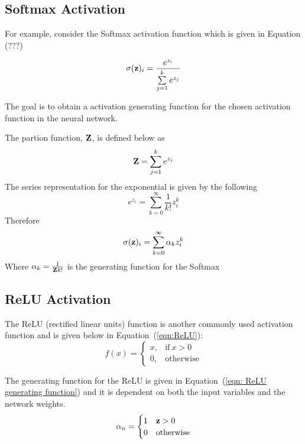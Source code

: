
\subsection{Softmax Activation}

For example, consider the Softmax activation function which is given in Equation (???)

\begin{equation}
	\sigma(\bold z)_i =
	\frac{e^{z_i}}{\sum\limits_{j=1}^k e^{z_j}}
\end{equation}

The goal is to obtain a activation generating function for the chosen activation function in the neural network.

The partion function, $\bold Z$, is defined below as
\begin{equation}
	\bold Z = \sum\limits_{j=1}^k e^{z_j}
\end{equation}
The series representation for the exponential is given by the following
\begin{equation}
	e^{z_{i}} = \sum_{k=0}^{\infty}\frac{1}{k!} z_{i}^{k}
\end{equation}
Therefore
\begin{equation}
	\sigma(\bold z)_i =
	\sum\limits_{k=0}^{\infty} \alpha_{k}z_{i}^{k}
\end{equation}
Where $\alpha_k = \frac{1}{{\bold Z}k!}$ is the generating function for the Softmax

\subsection{ReLU Activation}

The ReLU (rectified linear units) function is another commonly used activation function and is given below in Equation~(\ref{eqn:ReLU}):
\begin{equation}
	f(x) =
	\begin{cases}
		x, & \text{if}\ x > 0 \\
		0, & \text{otherwise}
	\end{cases}
	\label{eqn:ReLU}
\end{equation}

The generating function for the ReLU is given in Equation~(\ref{eqn: ReLU generating function}) and it is dependent on both the input variables and the network weights.
\begin{equation}
	\alpha_n =
		\begin{cases}
			1 & \bold z > 0 \\
			0 & \text{otherwise}
		\end{cases}
	\label{eqn: ReLU generating function}
\end{equation}

